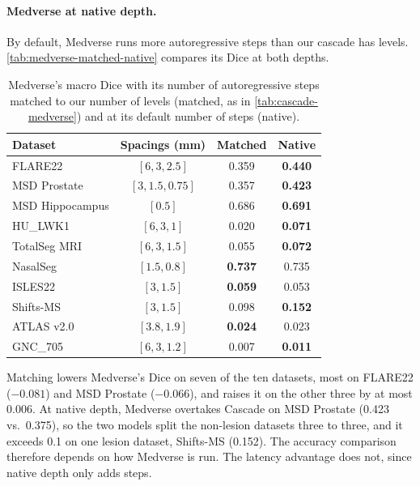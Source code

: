 \documentclass[hidelinks, a4paper, 12pt, ngerman, english]{article}  %
\begin{document}
\paragraph{Medverse at native depth.}
By default, Medverse runs more autoregressive steps than our cascade has
levels. \autoref{tab:medverse-matched-native} compares its Dice at both
depths.

\begin{table}[t]
  \centering
  \small
  \caption{Medverse's macro Dice with its number of autoregressive steps
  matched to our number of levels (matched, as in
  \autoref{tab:cascade-medverse}) and at its default number of steps
  (native).}
  \label{tab:medverse-matched-native}
  \begin{tabular}{@{}lccc@{}}
    \toprule
    Dataset & Spacings (mm) & Matched & Native \\
    \midrule
    FLARE22         & $[6, 3, 2.5]$    & 0.359 & \textbf{0.440} \\
    MSD Prostate    & $[3, 1.5, 0.75]$ & 0.357 & \textbf{0.423} \\
    MSD Hippocampus & $[0.5]$          & 0.686 & \textbf{0.691} \\
    HU\_LWK1        & $[6, 3, 1]$      & 0.020 & \textbf{0.071} \\
    TotalSeg MRI    & $[6, 3, 1.5]$    & 0.055 & \textbf{0.072} \\
    NasalSeg        & $[1.5, 0.8]$     & \textbf{0.737} & 0.735 \\
    \midrule
    ISLES22         & $[3, 1.5]$       & \textbf{0.059} & 0.053 \\
    Shifts-MS       & $[3, 1.5]$       & 0.098 & \textbf{0.152} \\
    ATLAS v2.0      & $[3.8, 1.9]$     & \textbf{0.024} & 0.023 \\
    GNC\_705        & $[6, 3, 1.2]$    & 0.007 & \textbf{0.011} \\
    \bottomrule
  \end{tabular}
\end{table}

Matching lowers Medverse's Dice on seven of the ten datasets, most on FLARE22
($-0.081$) and MSD Prostate ($-0.066$), and raises it on the other three by at
most 0.006. At native depth, Medverse overtakes Cascade on MSD Prostate (0.423
vs.\ 0.375), so the two models split the non-lesion datasets three to three,
and it exceeds 0.1 on one lesion dataset, Shifts-MS (0.152). The accuracy
comparison therefore depends on how Medverse is run. The latency advantage
does not, since native depth only adds steps.
\end{document}
